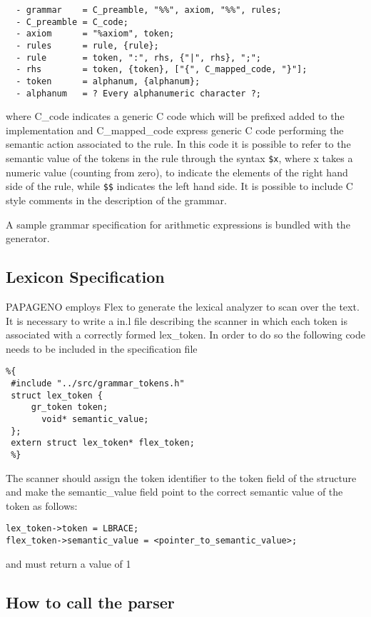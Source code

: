 \documentclass[a4paper,10pt]{article}
\begin{document}
\begin{verbatim}
  - grammar    = C_preamble, "%%", axiom, "%%", rules;
  - C_preamble = C_code;
  - axiom      = "%axiom", token;
  - rules      = rule, {rule};
  - rule       = token, ":", rhs, {"|", rhs}, ";";
  - rhs        = token, {token}, ["{", C_mapped_code, "}"];
  - token      = alphanum, {alphanum};
  - alphanum   = ? Every alphanumeric character ?;
\end{verbatim}


where C\_code indicates a  generic C code which will be prefixed added to the implementation 
and C\_mapped\_code express generic C code performing the semantic action associated to the rule.
In this code it is possible to refer to the semantic value of the tokens in the rule through the syntax \texttt{\$x}, 
where x takes a numeric value (counting from zero), to indicate the elements of the right hand side of the rule, 
while \texttt{\$\$} indicates the left hand side.
It is possible to include C style comments in the description of the grammar.

A sample grammar specification for arithmetic expressions is bundled with the generator.

\subsection{Lexicon Specification}

PAPAGENO employs Flex to generate the lexical analyzer to scan over the text.
It is necessary to write a in.l file describing the scanner in which each token is associated with
a correctly formed lex\_token. 
In order to do so the following code needs to be included in the specification file

\begin{verbatim}
%{
 #include "../src/grammar_tokens.h"
 struct lex_token {
     gr_token token;
       void* semantic_value;
 };
 extern struct lex_token* flex_token;
 %} 
\end{verbatim}

The scanner should assign the token identifier to the token field of the structure and make the semantic\_value field point to the correct semantic value of the token as follows:

\begin{verbatim}
lex_token->token = LBRACE;
flex_token->semantic_value = <pointer_to_semantic_value>; 
\end{verbatim}
and must return a value of 1

\subsection{How to call the parser}
\end{document}
